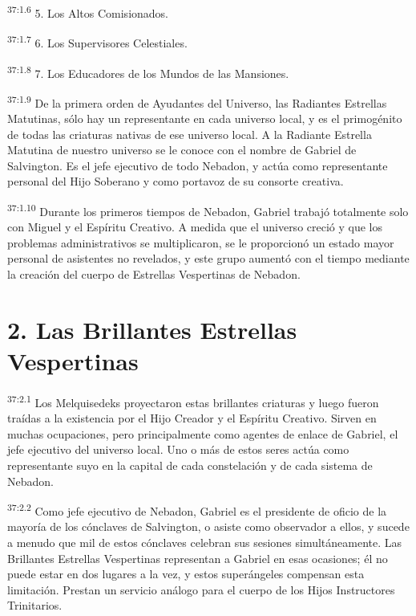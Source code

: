 \par
\textsuperscript{37:1.6} 5. Los Altos Comisionados.

\par
\textsuperscript{37:1.7} 6. Los Supervisores Celestiales.

\par
\textsuperscript{37:1.8} 7. Los Educadores de los Mundos de las Mansiones.

\par
\textsuperscript{37:1.9} De la primera orden de Ayudantes del Universo, las Radiantes Estrellas Matutinas, sólo hay un representante en cada universo local, y es el primogénito de todas las criaturas nativas de ese universo local. A la Radiante Estrella Matutina de nuestro universo se le conoce con el nombre de Gabriel de Salvington. Es el jefe ejecutivo de todo Nebadon, y actúa como representante personal del Hijo Soberano y como portavoz de su consorte creativa.

\par
\textsuperscript{37:1.10} Durante los primeros tiempos de Nebadon, Gabriel trabajó totalmente solo con Miguel y el Espíritu Creativo. A medida que el universo creció y que los problemas administrativos se multiplicaron, se le proporcionó un estado mayor personal de asistentes no revelados, y este grupo aumentó con el tiempo mediante la creación del cuerpo de Estrellas Vespertinas de Nebadon.

\section*{2. Las Brillantes Estrellas Vespertinas}
\par
\textsuperscript{37:2.1} Los Melquisedeks proyectaron estas brillantes criaturas y luego fueron traídas a la existencia por el Hijo Creador y el Espíritu Creativo. Sirven en muchas ocupaciones, pero principalmente como agentes de enlace de Gabriel, el jefe ejecutivo del universo local. Uno o más de estos seres actúa como representante suyo en la capital de cada constelación y de cada sistema de Nebadon.

\par
\textsuperscript{37:2.2} Como jefe ejecutivo de Nebadon, Gabriel es el presidente de oficio de la mayoría de los cónclaves de Salvington, o asiste como observador a ellos, y sucede a menudo que mil de estos cónclaves celebran sus sesiones simultáneamente. Las Brillantes Estrellas Vespertinas representan a Gabriel en esas ocasiones; él no puede estar en dos lugares a la vez, y estos superángeles compensan esta limitación. Prestan un servicio análogo para el cuerpo de los Hijos Instructores Trinitarios.


